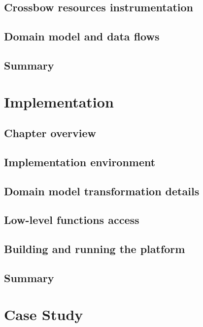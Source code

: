 \documentclass[11pt]{book}
\begin{document}
    \section{Crossbow resources instrumentation}


    \section{Domain model and data flows} \label{sec:domain-model}


    \section*{Summary}


  \chapter{Implementation}
    
    \section*{Chapter overview}


    \section{Implementation environment}


    \section{Domain model transformation details}


    \section{Low-level functions access}


    \section{Building and running the platform}


    \section*{Summary}


  \chapter{Case Study}
\end{document}
